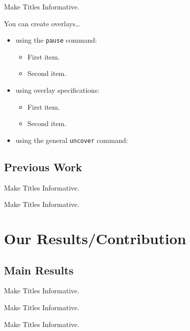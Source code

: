\documentclass[aspectratio=1610]{beamer}
\begin{document}
\begin{frame}{Make Titles Informative.}

  You can create overlays\dots
  \begin{itemize}
  \item using the \texttt{pause} command:
    \begin{itemize}
    \item
      First item.
      \pause
    \item    
      Second item.
    \end{itemize}
  \item
    using overlay specifications:
    \begin{itemize}
    \item<3->
      First item.
    \item<4->
      Second item.
    \end{itemize}
  \item
    using the general \texttt{uncover} command:
    \begin{itemize}
    \end{itemize}
  \end{itemize}
\end{frame}


\subsection{Previous Work}

\begin{frame}{Make Titles Informative.}
\end{frame}
\begin{frame}{Make Titles Informative.}
\end{frame}



\section{Our Results/Contribution}

\subsection{Main Results}

\begin{frame}{Make Titles Informative.}
\end{frame}
\begin{frame}{Make Titles Informative.}
\end{frame}
\begin{frame}{Make Titles Informative.}
\end{frame}
\end{document}
